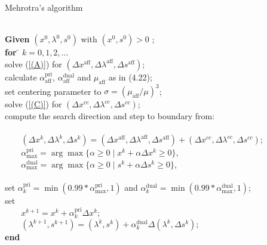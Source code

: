 \documentclass[a4paper,10 pt,titlepage,twoside]{book}
\theoremstyle{plain}
\theoremstyle{definition}
\theoremstyle{remark}
\begin{document}
\begin{algorithm}\caption{Mehrotra's algorithm}
\begin{tabbing}
	\\
	\textbf{Given} $(x^{0}, \lambda^{0}, s^{0})$ with $(x^{0}, s^{0})> 0$ ; \\
	\textbf{for} \= $k = 0, 1, 2,...$ \\
	\> solve (\ref{(A)}) for $(\Delta x^{\text{aff}},\Delta \lambda^{\text{aff}},\Delta s^{\text{aff}})$;\\
	\> calculate $\alpha_{\text{aff}}^{\text{pri}}$, $\alpha_{\text{aff}}^{\text{dual}}$ and $\mu_{\text{aff}}$ as in (4.22);\\
	\> set centering parameter to $\sigma = (\mu_{\text{aff}}/\mu)^{3}$; \\
	\> solve (\ref{(C)}) for $(\Delta x^{cc},\Delta \lambda^{cc},\Delta s^{cc})$;\\
	\> compute the search direction and step to boundary from: \\
	\> \\
	\> $\;\;\;\;\;\;\;(\Delta x^{k},\Delta \lambda^{k},\Delta s^{k})=(\Delta x^{\text{aff}},\Delta \lambda^{\text{aff}},\Delta s^{\text{aff}})+(\Delta x^{cc},\Delta  \lambda^{cc},\Delta s^{cc})$;\\
	\> $\;\;\;\;\;\;\;\alpha_{\text{max}}^{\text{pri}}=\arg\max\{\alpha\geq0\;|\;x^{k} +\alpha\Delta x^{k}\geq 0\}$,\\
	\> $\;\;\;\;\;\;\;\alpha_{\text{max}}^{\text{dual}}=\arg\max\{\alpha\geq0\;|\;s^{k} +\alpha\Delta s^{k}\geq 0\}$,\\
	\>\\
	\> set $\alpha_{k}^{\text{pri}}=\min(0.99\ast\alpha_{\text{max}}^{\text{pri}},1)$ and $\alpha_{k}^{\text{dual}}=\min(0.99\ast\alpha_{\text{max}}^{\text{dual}},1)$;\\
	\> set\\
	\> $\;\;\;\;\;\;\;x^{k+1} = x^{k} + \alpha_{k}^{\text{pri}}\Delta x^{k}$;\\
	\>$\;\;\;\;\;\;\;(\lambda^{k+1},s^{k+1}) = (\lambda^{k},s^{k}) + \alpha_{k}^{\text{dual}}\Delta (\lambda^{k},\Delta s^{k})$;\\
\textbf{end}
\end{tabbing}
\end{algorithm}
\newpage
\end{document}
